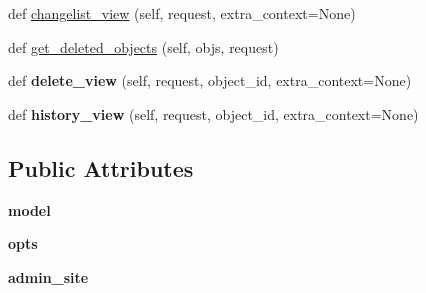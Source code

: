 \begin{DoxyCompactItemize}
\item 
def \mbox{\hyperlink{classdjango_1_1contrib_1_1admin_1_1options_1_1_model_admin_acb272476a6f9516740fba4c30665b094}{changelist\+\_\+view}} (self, request, extra\+\_\+context=None)
\item 
def \mbox{\hyperlink{classdjango_1_1contrib_1_1admin_1_1options_1_1_model_admin_a4877a3cf067df66ce015e5fa410dc343}{get\+\_\+deleted\+\_\+objects}} (self, objs, request)
\item 
\mbox{\label{classdjango_1_1contrib_1_1admin_1_1options_1_1_model_admin_a487bd56ecea6efa80d1cf5a0b39a192e}} 
def {\bfseries delete\+\_\+view} (self, request, object\+\_\+id, extra\+\_\+context=None)
\item 
\mbox{\label{classdjango_1_1contrib_1_1admin_1_1options_1_1_model_admin_a3f1c6b41902da68c9eb1d2a021faf426}} 
def {\bfseries history\+\_\+view} (self, request, object\+\_\+id, extra\+\_\+context=None)
\end{DoxyCompactItemize}
\subsection*{Public Attributes}
\begin{DoxyCompactItemize}
\item 
\mbox{\label{classdjango_1_1contrib_1_1admin_1_1options_1_1_model_admin_a840b3549819c1cd0b5fc565901bd2a09}} 
{\bfseries model}
\item 
\mbox{\label{classdjango_1_1contrib_1_1admin_1_1options_1_1_model_admin_a2e9dece02a9d1e0c0cdfc66508758f3e}} 
{\bfseries opts}
\item 
\mbox{\label{classdjango_1_1contrib_1_1admin_1_1options_1_1_model_admin_ae42291840fbfbcfc2a1df3b69998d5cd}} 
{\bfseries admin\+\_\+site}
\end{DoxyCompactItemize}
